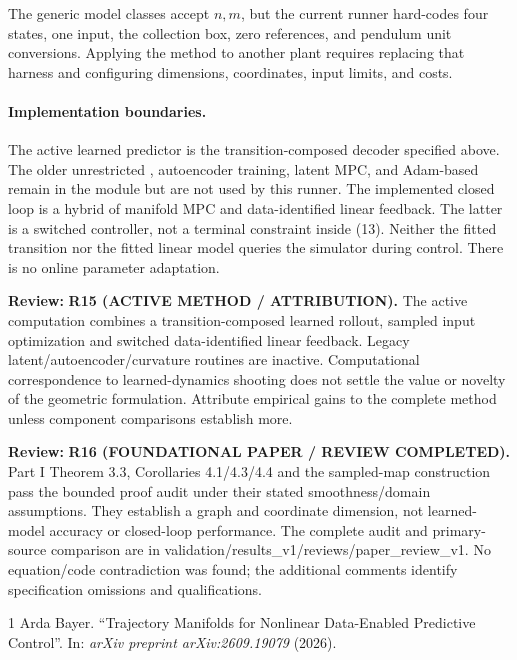 \documentclass[11pt]{article}
\newcommand{\review}[1]{\par\noindent\textcolor{red!70!black}{\textbf{Review:} #1}\par}
\newcommand{\code}[1]{\texttt{\detokenize{#1}}}
\begin{document}
The generic model classes accept $n,m$, but the current runner hard-codes four states, one input, the collection box, zero references, and pendulum unit conversions. Applying the method to another plant requires replacing that harness and configuring dimensions, coordinates, input limits, and costs.

\paragraph{Implementation boundaries.}
The active learned predictor is the transition-composed decoder specified above. The older unrestricted \code{BehaviorDecoder}, autoencoder training, latent MPC, and Adam-based \code{DataDrivenMPCSolver} remain in the module but are not used by this runner. The implemented closed loop is a hybrid of manifold MPC and data-identified linear feedback. The latter is a switched controller, not a terminal constraint inside (13). Neither the fitted transition nor the fitted linear model queries the simulator during control. There is no online parameter adaptation.
\review{\textbf{R15 (ACTIVE METHOD / ATTRIBUTION).} The active computation combines a transition-composed learned rollout, sampled input optimization and switched data-identified linear feedback. Legacy latent/autoencoder/curvature routines are inactive. Computational correspondence to learned-dynamics shooting does not settle the value or novelty of the geometric formulation. Attribute empirical gains to the complete method unless component comparisons establish more.}



\review{\textbf{R16 (FOUNDATIONAL PAPER / REVIEW COMPLETED).} Part I Theorem 3.3, Corollaries 4.1/4.3/4.4 and the sampled-map construction pass the bounded proof audit under their stated smoothness/domain assumptions. They establish a graph and coordinate dimension, not learned-model accuracy or closed-loop performance. The complete audit and primary-source comparison are in validation/results_v1/reviews/paper_review_v1. No equation/code contradiction was found; the additional comments identify specification omissions and qualifications.}
\begin{thebibliography}{1}
 Arda Bayer. ``Trajectory Manifolds for Nonlinear Data-Enabled Predictive Control''. In: \emph{arXiv preprint arXiv:2609.19079} (2026).
\end{thebibliography}
\end{document}
